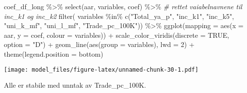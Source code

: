 \documentclass[
]{article}
\newenvironment{Shaded}{\begin{snugshade}}{\end{snugshade}}
\newcommand{\AttributeTok}[1]{\textcolor[rgb]{0.77,0.63,0.00}{#1}}
\newcommand{\CommentTok}[1]{\textcolor[rgb]{0.56,0.35,0.01}{\textit{#1}}}
\newcommand{\ConstantTok}[1]{\textcolor[rgb]{0.00,0.00,0.00}{#1}}
\newcommand{\DecValTok}[1]{\textcolor[rgb]{0.00,0.00,0.81}{#1}}
\newcommand{\FunctionTok}[1]{\textcolor[rgb]{0.00,0.00,0.00}{#1}}
\newcommand{\NormalTok}[1]{#1}
\newcommand{\SpecialCharTok}[1]{\textcolor[rgb]{0.00,0.00,0.00}{#1}}
\newcommand{\StringTok}[1]{\textcolor[rgb]{0.31,0.60,0.02}{#1}}
\begin{document}
\begin{Shaded}
\begin{Highlighting}[]
\NormalTok{coef\_df\_long }\SpecialCharTok{\%\textgreater{}\%} 
  \FunctionTok{select}\NormalTok{(aar, variables, coef) }\SpecialCharTok{\%\textgreater{}\%}
  \CommentTok{\# rettet vaiabelnavnene til inc\_k1 og inc\_k2}
  \FunctionTok{filter}\NormalTok{(}
\NormalTok{    variables }\SpecialCharTok{\%in\%} \FunctionTok{c}\NormalTok{(}\StringTok{"Total\_ya\_p"}\NormalTok{, }\StringTok{"inc\_k1"}\NormalTok{, }\StringTok{"inc\_k5"}\NormalTok{, }\StringTok{"uni\_k\_mf"}\NormalTok{, }\StringTok{"uni\_l\_mf"}\NormalTok{, }\StringTok{"Trade\_pc\_100K"}\NormalTok{)) }\SpecialCharTok{\%\textgreater{}\%}
  \FunctionTok{ggplot}\NormalTok{(}\AttributeTok{mapping =} \FunctionTok{aes}\NormalTok{(}\AttributeTok{x =}\NormalTok{ aar, }\AttributeTok{y =}\NormalTok{ coef, }\AttributeTok{colour =}\NormalTok{ variables)) }\SpecialCharTok{+}
  \FunctionTok{scale\_color\_viridis}\NormalTok{(}\AttributeTok{discrete =} \ConstantTok{TRUE}\NormalTok{, }\AttributeTok{option =} \StringTok{"D"}\NormalTok{) }\SpecialCharTok{+} 
  \FunctionTok{geom\_line}\NormalTok{(}\FunctionTok{aes}\NormalTok{(}\AttributeTok{group =}\NormalTok{ variables), }\AttributeTok{lwd =} \DecValTok{2}\NormalTok{) }\SpecialCharTok{+} 
  \FunctionTok{theme}\NormalTok{(}\AttributeTok{legend.position =} \StringTok{\textquotesingle{}bottom\textquotesingle{}}\NormalTok{)}
\end{Highlighting}
\end{Shaded}

\texttt{[image: model\_files/figure-latex/unnamed-chunk-30-1.pdf]}

Alle er stabile med unntak av Trade\_pc\_100K.
\end{document}
